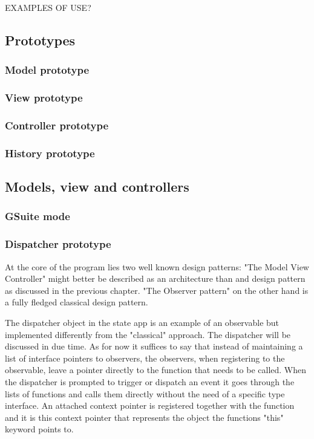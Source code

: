 \documentclass[english]{ifimaster}
\begin{document}
EXAMPLES OF USE?

\subsection{Prototypes}
\subsubsection{Model prototype}
\subsubsection{View prototype}
\subsubsection{Controller prototype}
\subsubsection{History prototype}

\subsection{Models, view and controllers} 

\subsubsection{GSuite mode}




\label{sec:models}
\subsubsection{Dispatcher prototype}
At the core of the program lies two well known design patterns: "The Model View Controller" might better be described as an architecture than and design pattern as discussed in the previous chapter. "The Observer pattern" on the other hand is a fully fledged classical design pattern.

The dispatcher object in the state app is an example of an observable but implemented differently from the "classical" approach. The dispatcher will be discussed in due time. As for now it suffices to say that instead of maintaining a list of interface pointers to observers, the observers, when registering to the observable, leave a pointer directly to the function that needs to be called. When the dispatcher is prompted to trigger or dispatch an event it goes through the lists of functions and calls them directly without the need of a specific type interface. An attached context pointer is registered together with the function and it is this context pointer that represents the object the functions "this" keyword points to.
\end{document}
